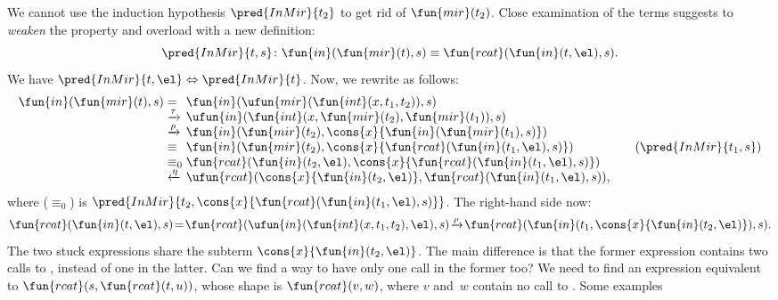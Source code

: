 We cannot use the induction hypothesis \(\pred{InMir}{t_2}\) to get
rid of \(\fun{mir}(t_2)\). Close examination of the terms suggests to
\emph{weaken} the property and overload  with a new
definition:
\begin{equation*}
\pred{InMir}{t,s} \colon \fun{in}(\fun{mir}(t),s) \equiv
\fun{rcat}(\fun{in}(t,\el),s).
\end{equation*}
We have \(\pred{InMir}{t,\el} \Leftrightarrow \pred{InMir}{t}\). Now,
we rewrite as follows:
\begin{equation*}
\begin{array}{@{}r@{\;}l@{\;}l@{\qquad}r@{}}
\fun{in}(\fun{mir}(t),s)
& =
& \fun{in}(\ufun{mir}(\fun{int}(x,t_1,t_2)),s)\\
& \xrightarrow{\smash{\tau}}
& \ufun{in}(\fun{int}(x,\fun{mir}(t_2),\fun{mir}(t_1)),s)\\
& \xrightarrow{\smash{\rho}}
& \fun{in}(\fun{mir}(t_2),\cons{x}{\fun{in}(\fun{mir}(t_1),s)})\\
& \equiv
& \fun{in}(\fun{mir}(t_2),\cons{x}{\fun{rcat}(\fun{in}(t_1,\el),s)})
& (\pred{InMir}{t_1,s})\\
& \equiv_0
& \fun{rcat}(\fun{in}(t_2,\el),\cons{x}{\fun{rcat}(\fun{in}(t_1,\el),s)})\\
& \xleftarrow{\smash{\eta}}
& \ufun{rcat}(\cons{x}{\fun{in}(t_2,\el)},\fun{rcat}(\fun{in}(t_1,\el),s)),
\end{array}
\end{equation*}
where (\(\equiv_0\)) is
\(\pred{InMir}{t_2,\cons{x}{\fun{rcat}(\fun{in}(t_1,\el),s)}}\).
The right\hyp{}hand side now:
\begin{equation*}
\fun{rcat}(\fun{in}(t,\el),s)
\! = \!
 \fun{rcat}(\ufun{in}(\fun{int}(x,t_1,t_2),\el),s)
\! \xrightarrow{\smash{\rho}}\!
 \fun{rcat}(\fun{in}(t_1,\cons{x}{\fun{in}(t_2,\el)}),s).
\end{equation*}
The two stuck expressions share the subterm
\(\cons{x}{\fun{in}(t_2,\el)}\). The main
difference is that the former expression contains two calls to
, instead of one in the
latter. Can we find a way to have only one call in the former too?  We
need to find an expression equivalent to
\(\fun{rcat}(s,\fun{rcat}(t,u))\), whose shape is \(\fun{rcat}(v,w)\),
where \(v\) and~\(w\) contain no call to . Some examples

